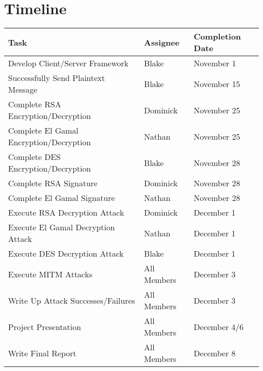 \documentclass{report}
\begin{document}
\section{Timeline}
\begin{tabular}{l|l|l}
    Task & Assignee & Completion Date \\ \hline
    Develop Client/Server Framework & Blake & November 1\\
    Successfully Send Plaintext Message & Blake & November 15\\
    Complete RSA Encryption/Decryption & Dominick & November 25\\
    Complete El Gamal Encryption/Decryption & Nathan & November 25\\
    Complete DES Encryption/Decryption & Blake & November 28\\
    Complete RSA Signature & Dominick & November 28\\
    Complete El Gamal Signature & Nathan & November 28\\
    Execute RSA Decryption Attack & Dominick & December 1\\
    Execute El Gamal Decryption Attack & Nathan & December 1\\
    Execute DES Decryption Attack & Blake & December 1\\
    Execute MITM Attacks & All Members & December 3\\
    Write Up Attack Successes/Failures & All Members & December 3\\
    Project Presentation & All Members & December 4/6\\ 
    Write Final Report & All Members & December 8
\end{tabular}

\end{document}
